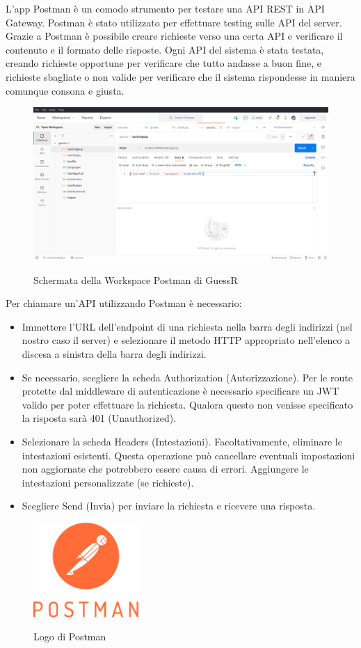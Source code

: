 L'app Postman è un comodo strumento per testare una API REST in API Gateway. Postman è stato utilizzato per effettuare testing sulle API del server.\newline
Grazie a Postman è possibile creare richieste verso una certa API e verificare il contenuto e il formato delle risposte.\newline
Ogni API del sistema è stata testata, creando richieste opportune per verificare che tutto andasse a buon fine, e richieste sbagliate o non valide per verificare che il sistema rispondesse in maniera comunque consona e giusta.
\begin{figure}[H]
    \caption{Schermata della Workspace Postman di GuessR }
    \centering
    \includegraphics[width=160mm]{img/test/postman.png}
    \label{fig:postmanScreem}
\end{figure}
Per chiamare un'API utilizzando Postman è necessario:
\begin{itemize}
    \item Immettere l'URL dell'endpoint di una richiesta nella barra degli indirizzi (nel nostro caso il server) e selezionare il metodo HTTP appropriato nell'elenco a discesa a sinistra della barra degli indirizzi.
    \item Se necessario, scegliere la scheda Authorization (Autorizzazione). Per le route protette dal middleware di autenticazione è necessario specificare un JWT valido per poter effettuare la richiesta. Qualora questo non venisse specificato la risposta sarà 401 (Unauthorized).
    \item Selezionare la scheda Headers (Intestazioni). Facoltativamente, eliminare le intestazioni esistenti. Questa operazione può cancellare eventuali impostazioni non aggiornate che potrebbero essere causa di errori. Aggiungere le intestazioni personalizzate (se richieste).
    \item Scegliere Send (Invia) per inviare la richiesta e ricevere una risposta.
\end{itemize}

\begin{figure}[H]
    \caption{Logo di Postman}
    \centering
    \includegraphics[width=40mm]{img/logos/postman_logo.png}
    \label{fig:postmanLogo}
\end{figure}

